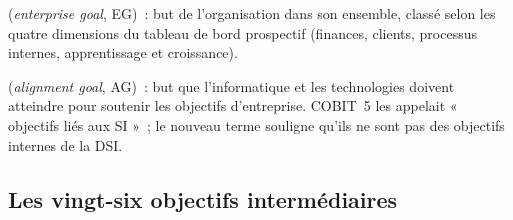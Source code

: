 \begin{boxdef}
(\textit{enterprise goal}, EG)~: but de l'organisation dans son ensemble,
classé selon les quatre dimensions du tableau de bord prospectif
(finances, clients, processus internes, apprentissage et croissance).

\medskip
{}
(\textit{alignment goal}, AG)~: but que l'informatique et les technologies
doivent atteindre pour soutenir les objectifs d'entreprise. COBIT~5 les
appelait « objectifs liés aux SI »~; le nouveau terme souligne qu'ils ne
sont pas des objectifs internes de la DSI.
\end{boxdef}

\subsection{Les vingt-six objectifs intermédiaires}

